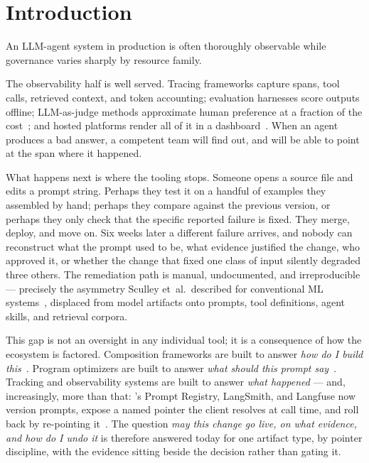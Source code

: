 \section{Introduction}
\label{sec:intro}

An LLM-agent system in production is often thoroughly observable while governance
varies sharply by resource family.

The observability half is well served. Tracing frameworks capture spans,
tool calls, retrieved context, and token accounting; evaluation harnesses score
outputs offline; LLM-as-judge methods approximate human preference at a fraction
of the cost~\cite{zheng2023judging,liu2023geval}; and hosted platforms
render all of it in a dashboard~\cite{langsmith,langfuse,phoenix}. When an agent
produces a bad answer, a competent team will find out, and will be able to point
at the span where it happened.

What happens next is where the tooling stops. Someone opens a source file and
edits a prompt string. Perhaps they test it on a handful of examples they
assembled by hand; perhaps they compare against the previous version, or perhaps
they only check that the specific reported failure is fixed. They merge, deploy,
and move on. Six weeks later a different failure arrives, and nobody can
reconstruct what the prompt used to be, what evidence justified the change, who
approved it, or whether the change that fixed one class of input silently
degraded three others. The remediation path is manual, undocumented, and
irreproducible --- precisely the asymmetry Sculley et~al.\ described for
conventional ML systems~\cite{sculley2015debt}, displaced from model artifacts
onto prompts, tool definitions, agent skills, and retrieval corpora.

This gap is not an oversight in any individual tool; it is a consequence of how
the ecosystem is factored. Composition frameworks are built to answer \emph{how do
I build this}~\cite{langchain,llamaindex}. Program optimizers are built to answer
\emph{what should this prompt say}~\cite{khattab2024dspy,agrawal2025gepa,
opsahlong2024mipro}. Tracking and observability systems are built to answer
\emph{what happened} --- and, increasingly, more than that: \mlflow{}'s Prompt
Registry, LangSmith, and Langfuse now version prompts, expose a named pointer the
client resolves at call time, and roll back by re-pointing
it~\cite{mlflowpromptregistry,langsmithprompts,langfuseprompts}. The question
\emph{may this change go live, on what evidence, and how do I undo it} is
therefore answered today for one artifact type, by pointer discipline, with the
evidence sitting beside the decision rather than gating it.

